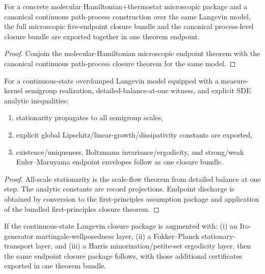\begin{theorem}\label{thm:langevin-molecular-pathprocess-joint-bundle}
For a concrete molecular Hamiltonian+thermostat microscopic package and a canonical continuous path-process construction over the same Langevin model, the full microscopic five-endpoint closure bundle and the canonical process-level closure bundle are exported together in one theorem endpoint.
\end{theorem}

\begin{proof}
Conjoin the molecular-Hamiltonian microscopic endpoint theorem with the canonical continuous path-process closure theorem for the same model.
\end{proof}

\begin{theorem}\label{thm:langevin-continuous-state-measure-closure}
For a continuous-state overdamped Langevin model equipped with a measure-kernel semigroup realization, detailed-balance-at-one witness, and explicit SDE analytic inequalities:
\begin{enumerate}
\item stationarity propagates to all semigroup scales,
\item explicit global Lipschitz/linear-growth/dissipativity constants are exported,
\item existence/uniqueness, Boltzmann invariance/ergodicity, and strong/weak Euler--Maruyama endpoint envelopes follow as one closure bundle.
\end{enumerate}
\end{theorem}

\begin{proof}
All-scale stationarity is the scale-flow theorem from detailed balance at one step. The analytic constants are record projections. Endpoint discharge is obtained by conversion to the first-principles assumption package and application of the bundled first-principles closure theorem.
\end{proof}

\begin{theorem}\label{thm:langevin-ito-fp-harris-closure}
If the continuous-state Langevin closure package is augmented with: (i) an Ito-generator martingale-wellposedness layer, (ii) a Fokker--Planck stationary-transport layer, and (iii) a Harris minorization/petite-set ergodicity layer, then the same endpoint closure package follows, with those additional certificates exported in one theorem bundle.
\end{theorem}


